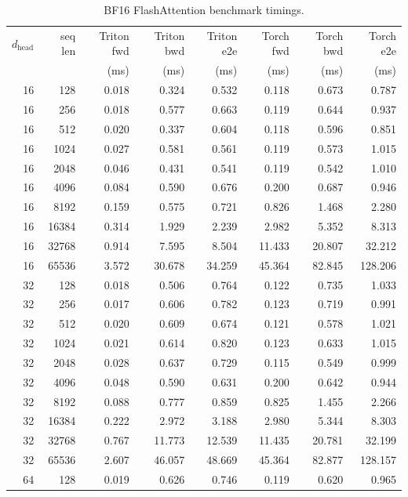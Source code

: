 \documentclass[11pt]{article}
\begin{document}
\begin{table}[H]
\centering
\scriptsize
\caption{BF16 FlashAttention benchmark timings.}
\setlength{\tabcolsep}{2pt}
\begin{tabular}{rrrrrrrr}
\toprule
$d_{\text{head}}$ & seq len & Triton fwd & Triton bwd & Triton e2e & Torch fwd & Torch bwd & Torch e2e \\
 &  & (ms) & (ms) & (ms) & (ms) & (ms) & (ms) \\
\midrule
16 & 128 & 0.018 & 0.324 & 0.532 & 0.118 & 0.673 & 0.787 \\
16 & 256 & 0.018 & 0.577 & 0.663 & 0.119 & 0.644 & 0.937 \\
16 & 512 & 0.020 & 0.337 & 0.604 & 0.118 & 0.596 & 0.851 \\
16 & 1024 & 0.027 & 0.581 & 0.561 & 0.119 & 0.573 & 1.015 \\
16 & 2048 & 0.046 & 0.431 & 0.541 & 0.119 & 0.542 & 1.010 \\
16 & 4096 & 0.084 & 0.590 & 0.676 & 0.200 & 0.687 & 0.946 \\
16 & 8192 & 0.159 & 0.575 & 0.721 & 0.826 & 1.468 & 2.280 \\
16 & 16384 & 0.314 & 1.929 & 2.239 & 2.982 & 5.352 & 8.313 \\
16 & 32768 & 0.914 & 7.595 & 8.504 & 11.433 & 20.807 & 32.212 \\
16 & 65536 & 3.572 & 30.678 & 34.259 & 45.364 & 82.845 & 128.206 \\
32 & 128 & 0.018 & 0.506 & 0.764 & 0.122 & 0.735 & 1.033 \\
32 & 256 & 0.017 & 0.606 & 0.782 & 0.123 & 0.719 & 0.991 \\
32 & 512 & 0.020 & 0.609 & 0.674 & 0.121 & 0.578 & 1.021 \\
32 & 1024 & 0.021 & 0.614 & 0.820 & 0.123 & 0.633 & 1.015 \\
32 & 2048 & 0.028 & 0.637 & 0.729 & 0.115 & 0.549 & 0.999 \\
32 & 4096 & 0.048 & 0.590 & 0.631 & 0.200 & 0.642 & 0.944 \\
32 & 8192 & 0.088 & 0.777 & 0.859 & 0.825 & 1.455 & 2.266 \\
32 & 16384 & 0.222 & 2.972 & 3.188 & 2.980 & 5.344 & 8.303 \\
32 & 32768 & 0.767 & 11.773 & 12.539 & 11.435 & 20.781 & 32.199 \\
32 & 65536 & 2.607 & 46.057 & 48.669 & 45.364 & 82.877 & 128.157 \\
64 & 128 & 0.019 & 0.626 & 0.746 & 0.119 & 0.620 & 0.965 \\

\end{tabular}
\end{table}
\end{document}
